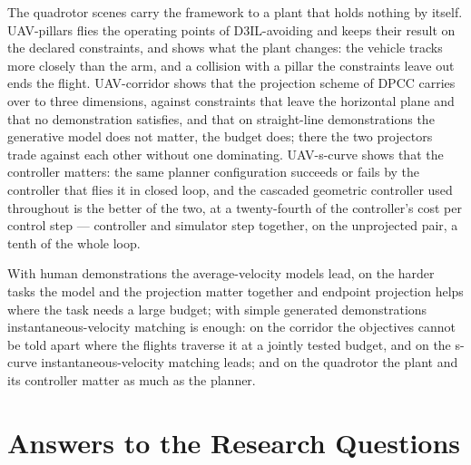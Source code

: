 The quadrotor scenes carry the framework to a plant that holds nothing by itself. UAV-pillars flies
the operating points of D3IL-avoiding and keeps their result on the declared constraints, and shows
what the plant changes: the vehicle tracks more closely than the arm, and a collision with a pillar the
constraints leave out ends the flight. UAV-corridor shows that the projection scheme of \ac{DPCC}
carries over to three dimensions, against constraints that leave the horizontal plane and that no
demonstration satisfies, and that on straight-line demonstrations the generative model does not
matter, the budget does; there the two projectors trade against each other without one dominating.
UAV-s-curve shows that the controller matters: the same planner configuration succeeds or fails by
the controller that flies it in closed loop, and the cascaded geometric controller used throughout is
the better of the two, at a twenty-fourth of the controller's cost per control step --- controller
and simulator step together, on the unprojected pair, a tenth of the whole loop.

With human demonstrations the average-velocity models lead, on the harder tasks the model and the
projection matter together and endpoint projection helps where the task needs a large budget; with
simple generated demonstrations instantaneous-velocity matching is enough: on the corridor the
objectives cannot be told apart where the flights traverse it at a jointly tested budget, and on the
s-curve instantaneous-velocity matching leads; and on the quadrotor the plant and its controller
matter as much as the planner.

\section{Answers to the Research Questions}\label{sec:conc:rqs}

